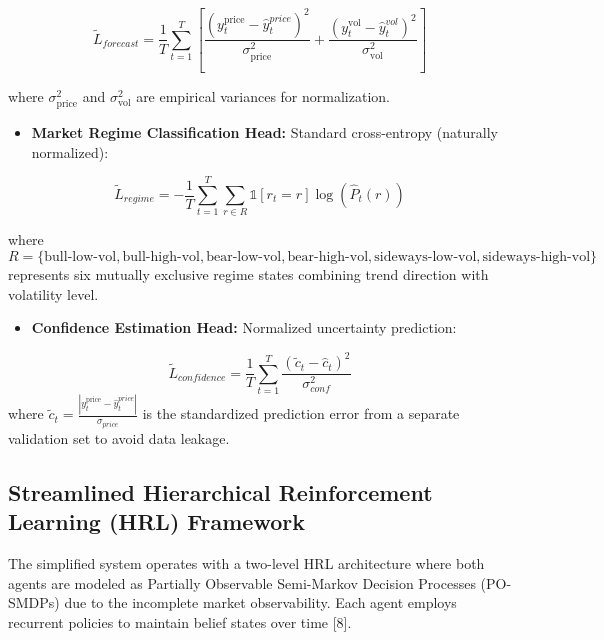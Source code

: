 \documentclass[11pt]{article}
\begin{document}
\begin{equation}
    \tilde{L}_{forecast} = \frac{1}{T} \sum_{t=1}^{T} \left[\frac{(y_t^{\text{price}} - \hat{y}_t^{price})^2}{\sigma_{\text{price}}^2} + \frac{(y_t^{\text{vol}} - \hat{y}_t^{vol})^2}{\sigma_{\text{vol}}^2}\right]
\end{equation}

    where $\sigma_{\text{price}}^2$ and $\sigma_{\text{vol}}^2$ are empirical variances for normalization.

\begin{itemize}
\item   \textbf{Market Regime Classification Head:} Standard cross-entropy (naturally normalized):
\end{itemize}
   \1

\begin{equation}
    \tilde{L}_{regime} = -\frac{1}{T} \sum_{t=1}^{T} \sum_{r \in R} \mathbb{1}[r_t = r] \log(\hat{P}_t(r))
\end{equation}

    where $R = \{\text{bull-low-vol}, \text{bull-high-vol}, \text{bear-low-vol}, \text{bear-high-vol}, \text{sideways-low-vol}, \text{sideways-high-vol}\}$ represents six mutually exclusive regime states combining trend direction with volatility level.

\begin{itemize}
\item   \textbf{Confidence Estimation Head:} Normalized uncertainty prediction:
\end{itemize}
\begin{equation}
\tilde{L}_{confidence} = \frac{1}{T} \sum_{t=1}^{T} \frac{(\tilde{c}_t - \hat{c}_t)^2}{\sigma_{conf}^2}
\end{equation}
    where $\tilde{c}_t = \frac{|y_t^{\text{price}} - \hat{y}_t^{price}|}{\sigma_{price}}$ is the standardized prediction error from a separate validation set to avoid data leakage.

\subsection{Streamlined Hierarchical Reinforcement Learning (HRL) Framework}

The simplified system operates with a two-level HRL architecture where both agents are modeled as Partially Observable Semi-Markov Decision Processes (PO-SMDPs) due to the incomplete market observability. Each agent employs recurrent policies to maintain belief states over time [8].
\end{document}

